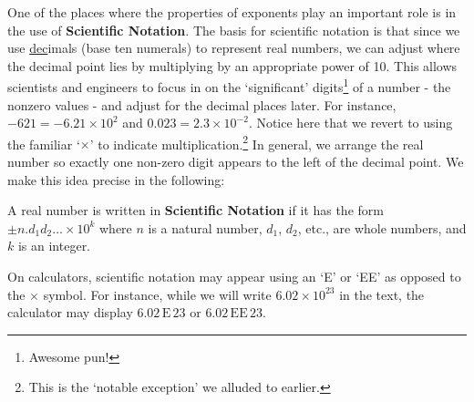 One of the places where the properties of exponents play an important role is in the use of \textbf{Scientific Notation}.  The basis for scientific notation is that since we use \underline{dec}imals (base ten numerals) to represent real numbers, we can adjust where the decimal point lies by multiplying by an appropriate power of 10.  This allows scientists and engineers to focus in on the `significant' digits\footnote{Awesome pun!} of a number - the nonzero values - and adjust for the decimal places later.  For instance, $-621 = -6.21 \times 10^2$ and $0.023 = 2.3 \times 10^{-2}$.  Notice here that we revert to using the familiar `$\times$' to indicate multiplication.\footnote{This is the `notable exception' we alluded to earlier.}   In general, we arrange the real number so exactly one non-zero digit appears to the left of the decimal point.  We make this idea precise in the following: 

\medskip

\colorbox{ResultColor}{\bbm

\begin{defn} \label{scientificnotation}

A real number is written in \textbf{Scientific Notation} if it has the form $\pm n . d_{1} d_{2} \ldots \times 10^{k}$ where $n$ is a natural number, $d_{1}$, $d_{2}$, etc., are whole numbers, and $k$ is an integer.

\end{defn}

\ebm}

\medskip

On calculators, scientific notation may appear using an `E' or `EE' as opposed to the $\times$ symbol.  For instance, while we will write $6.02 \times 10^{23}$ in the text, the calculator may display $6.02\, \text{E} \, 23$ or $6.02\, \text{EE} \, 23$. 

